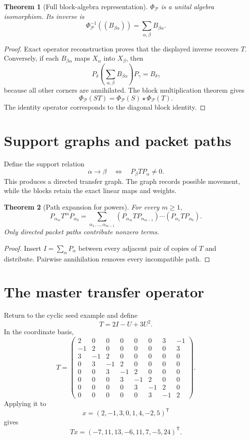 \documentclass[11pt,oneside]{book}
\newtheorem{theorem}{Theorem}[chapter]
\theoremstyle{definition}
\theoremstyle{remark}
\begin{document}
\begin{theorem}[Full block-algebra representation]\label{thm:block-algebra-iso}
$\Phi_{\mathcal P}$ is a unital algebra isomorphism.  Its inverse is
\[
\boxed{
\Phi_{\mathcal P}^{-1}((B_{\beta\alpha}))
=
\sum_{\alpha,\beta}B_{\beta\alpha}.
}
\]
\end{theorem}

\begin{proof}
Exact operator reconstruction proves that the displayed inverse recovers $T$.  Conversely, if each $B_{\beta\alpha}$ maps $X_\alpha$ into $X_\beta$, then
\[
P_\delta\left(\sum_{\alpha,\beta}B_{\beta\alpha}\right)P_\gamma
=B_{\delta\gamma}
\]
because all other corners are annihilated.  The block multiplication theorem gives
\[
\Phi_{\mathcal P}(ST)=\Phi_{\mathcal P}(S)\star\Phi_{\mathcal P}(T).
\]
The identity operator corresponds to the diagonal block identity.
\end{proof}

\section{Support graphs and packet paths}
Define the support relation
\[
\alpha\longrightarrow\beta
\quad\Longleftrightarrow\quad
P_\beta TP_\alpha\ne0.
\]
This produces a directed transfer graph.  The graph records possible movement, while the blocks retain the exact linear maps and weights.

\begin{theorem}[Path expansion for powers]\label{thm:path-power}
For every $m\ge1$,
\[
\boxed{
P_{\alpha_m}T^mP_{\alpha_0}
=
\sum_{\alpha_1,\ldots,\alpha_{m-1}}
(P_{\alpha_m}TP_{\alpha_{m-1}})\cdots
(P_{\alpha_1}TP_{\alpha_0}).
}
\]
Only directed packet paths contribute nonzero terms.
\end{theorem}

\begin{proof}
Insert $I=\sum_\alpha P_\alpha$ between every adjacent pair of copies of $T$ and distribute.  Pairwise annihilation removes every incompatible path.
\end{proof}

\section{The master transfer operator}
Return to the cyclic seed example and define
\[
T=2I-U+3U^2.
\]
In the coordinate basis,
\[
T=
\begin{pmatrix}
2&0&0&0&0&0&3&-1\\
-1&2&0&0&0&0&0&3\\
3&-1&2&0&0&0&0&0\\
0&3&-1&2&0&0&0&0\\
0&0&3&-1&2&0&0&0\\
0&0&0&3&-1&2&0&0\\
0&0&0&0&3&-1&2&0\\
0&0&0&0&0&3&-1&2
\end{pmatrix}.
\]
Applying it to
\[
x=(2,-1,3,0,1,4,-2,5)^{\mathsf T}
\]
gives
\[
\boxed{
Tx=(-7,11,13,-6,11,7,-5,24)^{\mathsf T}.
}
\]
\end{document}
